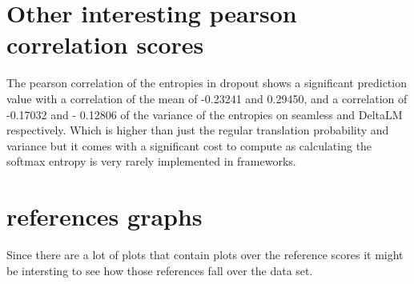 \section{Other interesting pearson correlation scores}\label{dropout softmax entropy}

The pearson correlation of the entropies in dropout shows a significant prediction value with a correlation of the mean of -0.23241 and 0.29450, and a correlation of -0.17032 and - 0.12806 of the variance of the entropies on seamless and DeltaLM respectively. Which is higher than just the regular translation probability and variance but it comes with a significant cost to compute as calculating the softmax entropy is very rarely implemented in frameworks.


 
  
 
  
  
 


\section{references graphs}
\label{sec:appendix:FirstSection}
Since there are a lot of plots that contain plots over the reference scores it might be intersting to see how those references fall over the data set. 

\setcounter{figure}{0}


